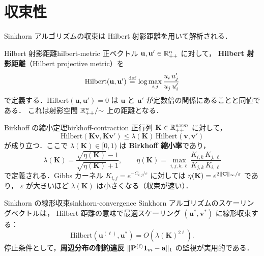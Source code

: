 \section{収束性}
\label{sec:sinkhorn-convergence}

Sinkhorn アルゴリズムの収束は Hilbert 射影距離を用いて解析される．

\begin{definition}{Hilbert 射影距離}{hilbert-metric}
  正ベクトル $\mathbf{u}, \mathbf{u}' \in \mathbb{R}_{++}^n$ に対して，
  \textbf{Hilbert 射影距離}（Hilbert projective metric）を
  \[
    \mathrm{Hilbert}(\mathbf{u}, \mathbf{u}')
    \overset{\mathrm{def}}{=} \log \max_{i,j} \frac{u_i \, u'_j}{u_j \, u'_i}
  \]
  で定義する．$\mathrm{Hilbert}(\mathbf{u}, \mathbf{u}') = 0$ は
  $\mathbf{u}$ と $\mathbf{u}'$ が定数倍の関係にあることと同値である．
  これは射影空間 $\mathbb{R}_{++}^n / {\sim}$ 上の距離となる．
\end{definition}

\begin{theorem}{Birkhoff の縮小定理}{birkhoff-contraction}
  正行列 $\mathbf{K} \in \mathbb{R}_{++}^{n \times m}$ に対して，
  \[
    \mathrm{Hilbert}(\mathbf{K}\mathbf{v}, \mathbf{K}\mathbf{v}')
    \leq \lambda(\mathbf{K}) \, \mathrm{Hilbert}(\mathbf{v}, \mathbf{v}')
  \]
  が成り立つ．ここで $\lambda(\mathbf{K}) \in [0, 1)$ は
  \textbf{Birkhoff 縮小率}であり，
  \[
    \lambda(\mathbf{K}) = \frac{\sqrt{\eta(\mathbf{K})} - 1}{\sqrt{\eta(\mathbf{K})} + 1}, \qquad
    \eta(\mathbf{K}) = \max_{i,j,k,\ell}
    \frac{K_{i,k} \, K_{j,\ell}}{K_{j,k} \, K_{i,\ell}}
  \]
  で定義される．Gibbs カーネル $K_{i,j} = e^{-C_{i,j}/\varepsilon}$ に対しては
  $\eta(\mathbf{K}) = e^{2\lVert \mathbf{C} \rVert_\infty / \varepsilon}$ であり，
  $\varepsilon$ が大きいほど $\lambda(\mathbf{K})$ は小さくなる（収束が速い）．
\end{theorem}

\begin{proposition}{Sinkhorn の線形収束}{sinkhorn-convergence}
  Sinkhorn アルゴリズムのスケーリングベクトルは，
  Hilbert 距離の意味で最適スケーリング $(\mathbf{u}^*, \mathbf{v}^*)$ に線形収束する：
  \[
    \mathrm{Hilbert}(\mathbf{u}^{(\ell)}, \mathbf{u}^*)
    = O(\lambda(\mathbf{K})^{2\ell}).
  \]
  停止条件として，\textbf{周辺分布の制約違反}
  $\lVert \mathbf{P}^{(\ell)} \mathbf{1}_m - \mathbf{a} \rVert_1$ の監視が実用的である．
\end{proposition}

